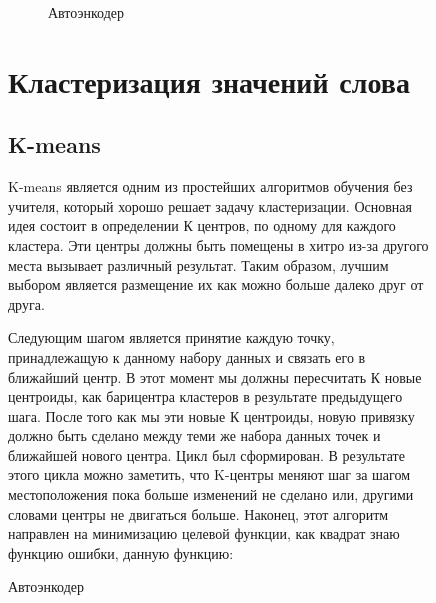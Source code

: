 \documentclass[12pt]{article}
\begin{document}
\begin{figure}[h]
  \begin{figure}[H]
    \noindent{}
    \caption{Автоэнкодер}
    \label{figCurves}
  \end{figure}

\section{Кластеризация значений слова}

\subsection{K-means}

K-means является одним из простейших алгоритмов обучения без учителя, который хорошо решает задачу кластеризации. Основная идея состоит в определении К центров, по одному для каждого кластера. Эти центры должны быть помещены в хитро из-за другого места вызывает различный результат. Таким образом, лучшим выбором является размещение их как можно больше далеко друг от друга.

Следующим шагом является принятие каждую точку, принадлежащую к данному набору данных и связать его в ближайший центр. В этот момент мы должны пересчитать К новые центроиды, как барицентра кластеров в результате предыдущего шага. После того как мы эти новые К центроиды, новую привязку должно быть сделано между теми же набора данных точек и ближайшей нового центра. Цикл был сформирован. В результате этого цикла можно заметить, что K-центры меняют шаг за шагом местоположения пока больше изменений не сделано или, другими словами центры не двигаться больше. Наконец, этот алгоритм направлен на минимизацию целевой функции, как квадрат знаю функцию ошибки, данную функцию:


\end{figure}
\end{document}
